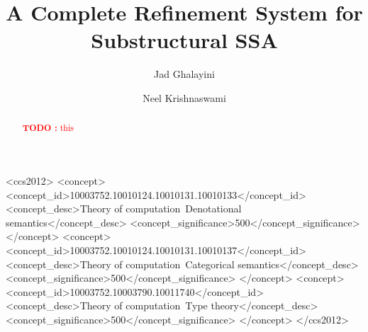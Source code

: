 \documentclass[acmsmall,screen,review]{acmart}
\newcounter{todos}
\newcommand{\TODO}[1]{{
  \stepcounter{todos}
  \begin{center}\large{\textcolor{red}{\textbf{TODO \arabic{todos}:} #1}}\end{center}
}}
\begin{document}
\title{A Complete Refinement System for Substructural SSA}

\author{Jad Ghalayini}

\author{Neel Krishnaswami}

\begin{abstract}
  \TODO{this}
\end{abstract}

\begin{CCSXML}
  <ccs2012>
  <concept>
  <concept_id>10003752.10010124.10010131.10010133</concept_id>
  <concept_desc>Theory of computation~Denotational semantics</concept_desc>
  <concept_significance>500</concept_significance>
  </concept>
  <concept>
  <concept_id>10003752.10010124.10010131.10010137</concept_id>
  <concept_desc>Theory of computation~Categorical semantics</concept_desc>
  <concept_significance>500</concept_significance>
  </concept>
  <concept>
  <concept_id>10003752.10003790.10011740</concept_id>
  <concept_desc>Theory of computation~Type theory</concept_desc>
  <concept_significance>500</concept_significance>
  </concept>
  </ccs2012>
\end{CCSXML}




\maketitle
\end{document}
